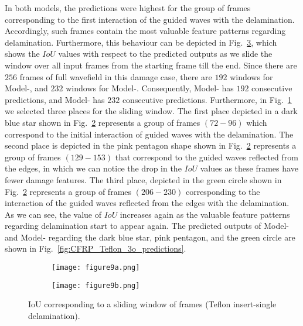 In both models, the predictions were highest for the group of frames corresponding to the first interaction of the guided waves with the delamination.
Accordingly, such frames contain the most valuable feature patterns regarding delamination. 
Furthermore, this behaviour can be depicted in Fig.~\ref{fig:CFRP_Teflon_3o_IoU_centre_window}, which shows the \(IoU\) values with respect to the predicted outputs as we slide the window over all input frames from the starting frame till the end.
Since there are \(256\) frames of full wavefield in this damage case, there are \(192\) windows for Model-, and \(232\) windows for Model-.
Consequently, Model- has \(192\) consecutive predictions, and Model- has \(232\) consecutive predictions.
Furthermore, in Fig.~\ref{fig:CFRP_Teflon_3o_IoU_} we selected three places for the sliding window. 
The first place depicted in a dark blue star shown in Fig.~\ref{fig:CFRP_teflon_3o_shapes_} represents a group of frames \((72-96)\) which correspond to the initial interaction of guided waves with the delamination.
The second place is depicted in the pink pentagon shape shown in Fig.~\ref{fig:CFRP_teflon_3o_shapes_} represents a group of frames \((129-153)\) that correspond to the guided waves reflected from the edges, in which we can notice the drop in the \(IoU\) values as these frames have fewer damage features.
The third place, depicted in the green circle shown in Fig.~\ref{fig:CFRP_teflon_3o_shapes_} represents a group of frames \((206-230)\) corresponding to the interaction of the guided waves reflected from the edges with the delamination.
As we can see, the value of \(IoU\) increases again as the valuable feature patterns regarding delamination start to appear again.
The predicted outputs of Model- and Model- regarding the dark blue star, pink pentagon, and the green circle are shown in Fig.~\ref{fig:CFRP_Teflon_3o_predictions}.
\begin{figure} [!h]
	\begin{subfigure}[b]{1\textwidth}
		\centering
		\texttt{[image: figure9a.png]}
		\caption{}
		\label{fig:CFRP_Teflon_3o_IoU_}
	\end{subfigure}
	\par\medskip
	\begin{subfigure}[b]{1\textwidth}
		\centering
		\texttt{[image: figure9b.png]}
		\caption{} 
		\label{fig:CFRP_teflon_3o_shapes_}
	\end{subfigure}
	\caption{IoU corresponding to a sliding window of frames (Teflon insert-single delamination).}
	\label{fig:CFRP_Teflon_3o_IoU_centre_window}
\end{figure} 
